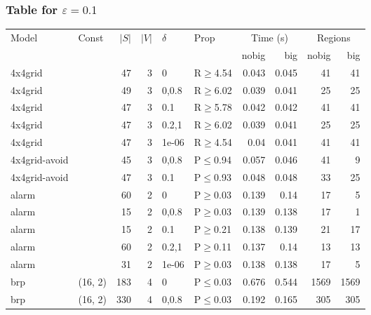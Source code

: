 \subsubsection{Table for \(\varepsilon=0.1\)}
\begin{longtable}{llrrllrrrr}

        \toprule
        Model & Const & $|S|$ & $|V|$ & $\delta$ & Prop & \multicolumn{2}{c}{Time (s)} & \multicolumn{2}{c}{Regions} \\
        \cmidrule(ll){7-8} \cmidrule(ll){9-10}
        & & & & & & nobig & big & nobig & big \\
        \midrule
        
 4x4grid       &          &     	47 &   3 & 0     & R$\geq$4.54  & 0.043   & 0.045   & 41      & 41   \\
 4x4grid       &          &     	49 &   3 & 0,0.8 & R$\geq$6.02  & 0.039   & 0.041   & 25      & 25   \\
 4x4grid       &          &     	47 &   3 & 0.1   & R$\geq$5.78  & 0.042   & 0.042   & 41      & 41   \\
 4x4grid       &          &     	47 &   3 & 0.2,1 & R$\geq$6.02  & 0.039   & 0.041   & 25      & 25   \\
 4x4grid       &          &     	47 &   3 & 1e-06 & R$\geq$4.54  & 0.04    & 0.041   & 41      & 41   \\
 4x4grid-avoid &          &     	45 &   3 & 0,0.8 & P$\leq$0.94  & 0.057   & 0.046   & 41      & 9    \\
 4x4grid-avoid &          &     	47 &   3 & 0.1   & P$\leq$0.93  & 0.048   & 0.048   & 33      & 25   \\
 alarm         &          &     	60 &   2 & 0     & P$\geq$0.03  & 0.139   & 0.14    & 17      & 5    \\
 alarm         &          &     	15 &   2 & 0,0.8 & P$\geq$0.03  & 0.139   & 0.138   & 17      & 1    \\
 alarm         &          &     	15 &   2 & 0.1   & P$\geq$0.21  & 0.138   & 0.139   & 21      & 17   \\
 alarm         &          &     	60 &   2 & 0.2,1 & P$\geq$0.11  & 0.137   & 0.14    & 13      & 13   \\
 alarm         &          &     	31 &   2 & 1e-06 & P$\geq$0.03  & 0.138   & 0.138   & 17      & 5    \\
 brp           & (16, 2)  &    	183 &   4 & 0     & P$\leq$0.03  & 0.676   & 0.544   & 1569    & 1569 \\
 brp           & (16, 2)  &    	330 &   4 & 0,0.8 & P$\leq$0.03  & 0.192   & 0.165   & 305     & 305  \\

\end{longtable}
